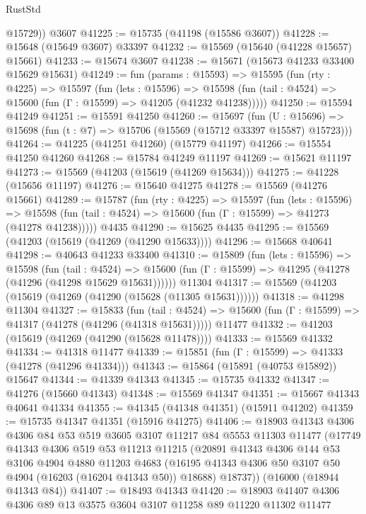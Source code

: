 \begin{lexlean}{RustStd}
\begin{coremodule}
        @15729))
    @3607
@41225 := @15735 (@41198 (@15586 @3607))
@41228 := @15648 (@15649 @3607) @33397
@41232 := @15569 (@15640 (@41228 @15657) @15661)
@41233 := @15674 @3607
@41238 := @15671 (@15673 @41233 @33400 @15629 @15631)
@41249 := fun (params : @15593) =>
  @15595
    (fun (rty : @4225) =>
    @15597
      (fun (lets : @15596) =>
      @15598 (fun (tail : @4524) => @15600 (fun (Γ : @15599) => @41205 (@41232 @41238)))))
@41250 := @15594 @41249
@41251 := @15591 @41250
@41260 := @15697
    (fun (U : @15696) => @15698 (fun (t : @7) => @15706 (@15569 (@15712 @33397 @15587) @15723)))
@41264 := @41225 (@41251 @41260) (@15779 @41197)
@41266 := @15554 @41250 @41260
@41268 := @15784 @41249 @11197
@41269 := @15621 @11197
@41273 := @15569 (@41203 (@15619 (@41269 @15634)))
@41275 := @41228 (@15656 @11197)
@41276 := @15640 @41275
@41278 := @15569 (@41276 @15661)
@41289 := @15787
    (fun (rty : @4225) =>
    @15597
      (fun (lets : @15596) =>
      @15598 (fun (tail : @4524) => @15600 (fun (Γ : @15599) => @41273 (@41278 @41238)))))
    @4435
@41290 := @15625 @4435
@41295 := @15569 (@41203 (@15619 (@41269 (@41290 @15633))))
@41296 := @15668 @40641
@41298 := @40643 @41233 @33400
@41310 := @15809
    (fun (lets : @15596) =>
    @15598
      (fun (tail : @4524) =>
      @15600 (fun (Γ : @15599) => @41295 (@41278 (@41296 (@41298 @15629 @15631))))))
    @11304
@41317 := @15569 (@41203 (@15619 (@41269 (@41290 (@15628 (@11305 @15631))))))
@41318 := @41298 @11304
@41327 := @15833
    (fun (tail : @4524) => @15600 (fun (Γ : @15599) => @41317 (@41278 (@41296 (@41318 @15631)))))
    @11477
@41332 := @41203 (@15619 (@41269 (@41290 (@15628 @11478))))
@41333 := @15569 @41332
@41334 := @41318 @11477
@41339 := @15851 (fun (Γ : @15599) => @41333 (@41278 (@41296 @41334)))
@41343 := @15864 (@15891 (@40753 @15892)) @15647
@41344 := @41339 @41343
@41345 := @15735 @41332
@41347 := @41276 (@15660 @41343)
@41348 := @15569 @41347
@41351 := @15667 @41343 @40641 @41334
@41355 := @41345 (@41348 @41351) (@15911 @41202)
@41359 := @15735 @41347 @41351 (@15916 @41275)
@41406 := @18903
    @41343
    @4306
    @4306
    @84
    @53
    @519
    @3605
    @3107
    @11217
    @84
    @5553
    @11303
    @11477
    (@17749
      @41343
      @4306
      @519
      @53
      @11213
      @11215
      (@20891
        @41343
        @4306
        @144
        @53
        @3106
        @4904
        @4880
        @11203
        @4683
        (@16195 @41343 @4306 @50 @3107 @50 @4904 (@16203 (@16204 @41343 @50)) @18688)
        @18737))
    (@16000 (@18944 @41343 @84))
@41407 := @18493 @41343
@41420 := @18903 @41407 @4306 @4306 @89 @13 @3575 @3604 @3107 @11258 @89 @11220 @11302 @11477

\end{coremodule}
\end{lexlean}
